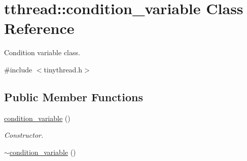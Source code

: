 \hypertarget{classtthread_1_1condition__variable}{}\section{tthread\+:\+:condition\+\_\+variable Class Reference}
\label{classtthread_1_1condition__variable}


Condition variable class.  




{\ttfamily \#include $<$tinythread.\+h$>$}

\subsection*{Public Member Functions}
\begin{DoxyCompactItemize}
\item 
\hyperlink{classtthread_1_1condition__variable_ab7d3340f1fe6fbe922a2534762312d76}{condition\+\_\+variable} ()\hypertarget{classtthread_1_1condition__variable_ab7d3340f1fe6fbe922a2534762312d76}{}\label{classtthread_1_1condition__variable_ab7d3340f1fe6fbe922a2534762312d76}

\begin{DoxyCompactList}\small\item\em Constructor. \end{DoxyCompactList}\item 
\hyperlink{classtthread_1_1condition__variable_a081b6f8a483333135388b67b86b5cc11}{$\sim$condition\+\_\+variable} ()\hypertarget{classtthread_1_1condition__variable_a081b6f8a483333135388b67b86b5cc11}{}\label{classtthread_1_1condition__variable_a081b6f8a483333135388b67b86b5cc11}


\end{DoxyCompactItemize}

